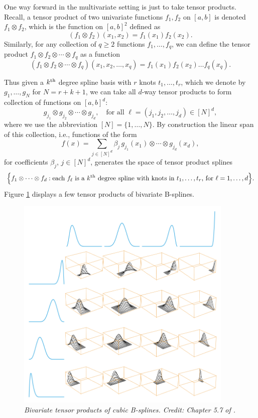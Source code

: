 \documentclass{article}
\begin{document}
One way forward in the multivariate setting is just to take tensor
products. Recall, a tensor product of two univariate functions $f_1,f_2$ on
$[a,b]$ is denoted $f_1 \otimes f_2$, which is the function on $[a,b]^2$ defined
as  
\[
(f_1 \otimes f_2)(x_1, x_2) = f_1(x_1) f_2(x_2). 
\]
Similarly, for any collection of $q \geq 2$ functions $f_1,\dots,f_q$, we can
define the tensor product $f_1 \otimes f_2 \otimes \cdots \otimes f_q$ as a
function 
\[
(f_1 \otimes f_2 \otimes \cdots \otimes f_q)(x_1, x_2, \dots, x_q) = f_1(x_1) 
f_2(x_2) \dots f_q(x_q).
\]

Thus given a $k^{\text{th}}$ degree spline basis with $r$ knots $t_1,\dots,t_r$, which we
denote by $g_1,\dots,g_N$ for $N=r+k+1$, we can take all $d$-way tensor
products to form collection of functions on $[a,b]^d$:
\[
g_{j_1} \otimes g_{j_2} \otimes \cdots \otimes g_{j_d}, \quad \text{for all
  $\ell = (j_1, j_2, \dots, j_d) \in [N]^d$}, 
\]
where we use the abbreviation $[N] = \{1,\dots,N\}$. By construction the linear
span of this collection, i.e., functions of the form    
\[
f(x) = \sum_{j \in [N]^d} \beta_j \, g_{j_1}(x_1) \otimes \cdots \otimes 
g_{j_d}(x_d),   
\]
for coefficients $\beta_j$, $j \in [N]^d$, generates the space of tensor 
product splines 
\[
\Big\{ f_1 \otimes \cdots \otimes f_d : \text{each $f_\ell$ is a $k^{\text{th}}$ degree
  spline with knots in $t_1,\dots,t_r$, for $\ell=1,\dots,d$} \Big\}.  
\]
Figure \ref{fig:tensor} displays a few tensor products of bivariate B-splines.

\begin{figure}[!t]
\centering
\includegraphics[width=0.925\textwidth]{tensor.png}
\caption{\it Bivariate tensor products of cubic B-splines. Credit: Chapter 5.7
  of \citet{hastie2009elements}.}    
\label{fig:tensor}
\end{figure}
\end{document}
